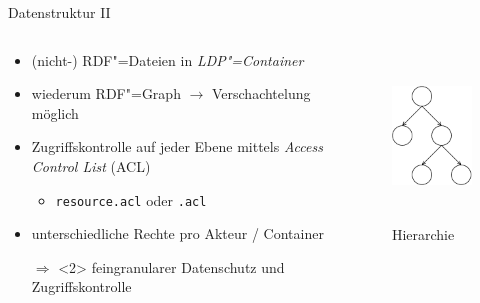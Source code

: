 \begin{frame}{Datenstruktur II \footnotesize\cite{mecklerWebLinkedData2023,sambraSolidPlatformDecentralized2016}}
    \begin{columns}
        \begin{column}{0.6\textwidth}
            \begin{itemize}
                \item (nicht-) RDF"=Dateien in \emph{LDP"=Container}
                \item wiederum RDF"=Graph $\to$ Verschachtelung möglich
                \item Zugriffskontrolle auf jeder Ebene mittels \emph{Access Control List} (ACL)
                \begin{itemize}
                    \item \texttt{resource.acl} oder \texttt{.acl}
                \end{itemize}
                
                \item<2> unterschiedliche Rechte pro Akteur / Container
                \item[$\Rightarrow$]<2> feingranularer Datenschutz und Zugriffskontrolle
            \end{itemize}
        \end{column}

        \begin{column}{0.4\textwidth}
            \vspace{1em}
            \begin{figure}
                \includegraphics[height=4.5cm]{./assets/container_hierarchy.drawio.pdf}
                \caption{Hierarchie \cite[vgl.][]{sambraSolidPlatformDecentralized2016}}
            \end{figure}
        \end{column}
    \end{columns}
\end{frame}


